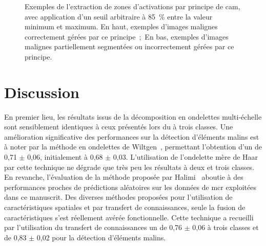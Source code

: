 \begin{figure}[p]
    \caption{Exemples de l'extraction de zones d'activations par principe de \gls{cam}, avec application d'un seuil arbitraire à 85~\% entre la valeur minimum et maximum. En haut, exemples d'images malignes correctement gérées par ce principe~;~En bas, exemples d'images malignes partiellement segmentées ou incorrectement gérées par ce principe.}
    \label{fig:example_image_improvement_ft}
\end{figure}\par
\clearpage

\section{Discussion}
En premier lieu, les résultats issus de la décomposition en ondelettes multi-échelle sont sensiblement identiques à ceux présentés lors du  à trois classes. Une amélioration significative des performances sur la détection d'éléments malins est à noter par la méthode en ondelettes de Wiltgen~, permettant l'obtention d'un \fscore{} de 0,71 $\pm$ 0,06, initialement à 0,68 $\pm$ 0,03. L'utilisation de l'ondelette mère de Haar par cette technique ne dégrade que très peu les résultats à deux et trois classes. En revanche, l'évaluation de la méthode proposée par Halimi~ aboutie à des performances proches de prédictions aléatoires sur les données de \gls{mcr} exploitées dans ce manuscrit. Des diverses méthodes proposées pour l'utilisation de caractéristiques spatiales et par transfert de connaissances, seule la fusion de caractéristiques s'est réellement avérée fonctionnelle. Cette technique a recueilli par l'utilisation du transfert de connaissances un \fscore{} de 0,76 $\pm$ 0,06 à trois classes et de 0,83 $\pm$ 0,02 pour la détection d'éléments malins.\par

